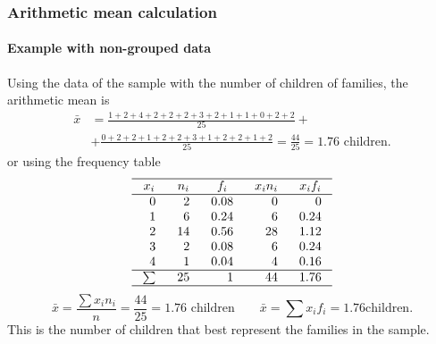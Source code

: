 \begin{frame}
\frametitle{Arithmetic mean calculation}
\framesubtitle{Example with non-grouped data}
Using the data of the sample with the number of children of families, the arithmetic mean is
\small
\begin{align*}
\bar{x} &= \frac{1+2+4+2+2+2+3+2+1+1+0+2+2}{25}+\\
&+\frac{0+2+2+1+2+2+3+1+2+2+1+2}{25} = \frac{44}{25} = 1.76 \mbox{ children}.
\end{align*}
\normalsize
or using the frequency table
\small
\[
\setlength\arraycolsep{3mm}
\setlength\arrayrulewidth{0.5pt}
\begin{array}{rrrrr}
\hline
\multicolumn{1}{c}{x_i} & \multicolumn{1}{c}{n_i} & \multicolumn{1}{c}{f_i} & \multicolumn{1}{c}{x_in_i} & \multicolumn{1}{c}{x_if_i}\\
\hline
0 & 2 & 0.08 & 0 & 0\\
1 & 6 & 0.24 & 6 & 0.24\\
2 & 14 & 0.56 & 28 & 1.12\\
3 & 2  & 0.08 & 6 & 0.24\\
4 & 1 & 0.04 & 4 & 0.16 \\
\hline
\sum & 25 & 1 & 44 & 1.76 \\
\hline
\end{array}
\]
\normalsize
\[
\bar{x} = \frac{\sum x_in_i}{n} = \frac{44}{25}= 1.76\mbox{ children} \qquad \bar{x}=\sum{x_if_i} = 1.76 \mbox{
children}.
\]
This is the number of children that best represent the families in the sample.
\end{frame}


